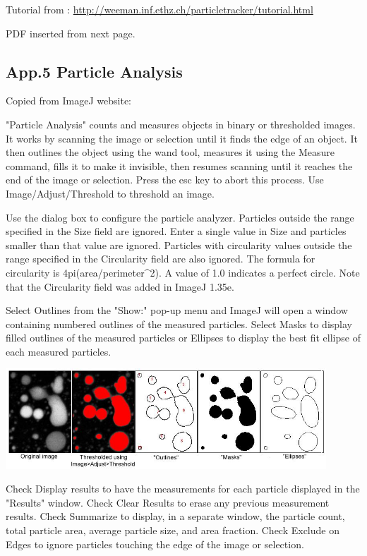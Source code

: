 Tutorial from : \url{http://weeman.inf.ethz.ch/particletracker/tutorial.html}

PDF inserted from next page. 



\clearpage
\subsection{App.5 Particle Analysis}
\label{app5}
Copied from ImageJ website:

"Particle Analysis" counts and measures
objects in binary or thresholded images. It works by scanning the image
or selection until it finds the edge of an object. It then outlines the
object using the wand tool, measures it using the Measure command,
fills it to make it invisible, then resumes scanning until it reaches
the end of the image or selection. Press the esc key to abort this
process. Use Image/Adjust/Threshold to threshold an image.



Use the dialog box to configure the particle analyzer. Particles outside
the range specified in the Size field are ignored. Enter a single value
in Size and particles smaller than that value are ignored. Particles
with circularity values outside the range specified in the Circularity
field are also ignored. The formula for circularity is
4pi(area/perimeter\^{}2). A value of 1.0 indicates a perfect circle.
Note that the Circularity field was added in ImageJ 1.35e.

Select Outlines from the "Show:" pop-up menu
and ImageJ will open a window containing numbered outlines of the
measured particles. Select Masks to display filled outlines of the
measured particles or Ellipses to display the best fit ellipse of each
measured particles.

\includegraphics[width=12cm]{fig/CMCIBasicCourse201102-img169.jpg}

Check Display results to have the measurements for each particle
displayed in the "Results" window. Check
Clear Results to erase any previous measurement results. Check
Summarize to display, in a separate window, the particle count, total
particle area, average particle size, and area fraction. Check Exclude
on Edges to ignore particles touching the edge of the image or
selection.

